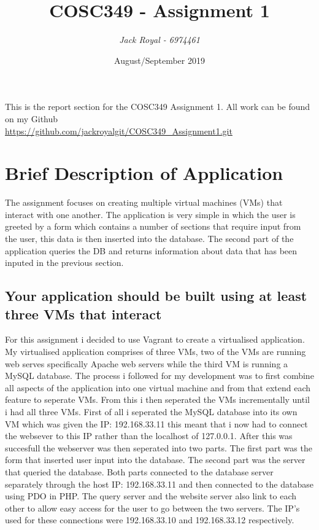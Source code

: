\documentclass[12pt, article, oneside]{article}
\title{\textbf{COSC349 - Assignment 1}}
\author{\textit{Jack Royal - 6974461}}
\date{August/September 2019}
\begin{document}
 
\maketitle
 
This is the report section for the COSC349 Assignment 1. All work can be found on my Github \\
\url{https://github.com/jackroyalgit/COSC349_Assignment1.git}
\newpage
\section{Brief Description of Application}
The assignment focuses on creating multiple virtual machines (VMs) that interact with one another. The application is very simple in which the user is greeted by a form which contains a number of sections that require input from the user, this data is then inserted into the database. The second part of the application queries the DB and returns information about data that has been inputed in the previous section.

\subsection{Your application should be built using at least three VMs that interact}
For this assignment i decided to use Vagrant to create a virtualised application. My virtualised application comprises of three VMs, two of the VMs are running web serves specifically Apache web servers while the third VM is running a MySQL database. The process i followed for my development was to first combine all aspects of the application into one virtual machine and from that extend each feature to seperate VMs. From this i then seperated the VMs incrementally until i had all three VMs. First of all i seperated the MySQL database into its own VM which was given the IP: 192.168.33.11 this meant that i now had to connect the websever to this IP rather than the localhost of 127.0.0.1. After this was succesfull the webserver was then seperated into two parts. The first part was the form that inserted user input into the database. The second part was the server that queried the database. Both parts connected to the database server separately through the host IP: 192.168.33.11 and then connected to the database using PDO in PHP. The query server and the website server also link to each other to allow easy access for the user to go between the two servers. The IP's used for these connections were 192.168.33.10 and 192.168.33.12 respectively.
\end{document}
